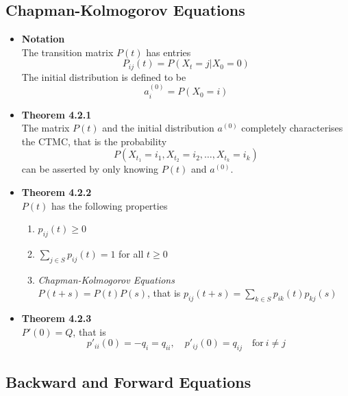 \documentclass[11pt,a4paper]{article}
\begin{document}
\subsection{Chapman-Kolmogorov Equations}

\begin{itemize}
    \item \textbf{Notation} \\
        The transition matrix $P(t)$ has entries
        \[
            P_{ij}(t) = P(X_t = j | X_0 = 0)
        \]
        The initial distribution is defined to be
        \[
            a_i^{(0)} = P(X_0 = i)
        \]

    \item \textbf{Theorem 4.2.1} \\
        The matrix $P(t)$ and the initial distribution $a^{(0)}$ completely characterises the CTMC,
        that is the probability
        \[
            P(X_{t_1} = i_1, X_{t_2} = i_2, \ldots, X_{t_k} = i_k)
        \]
        can be asserted by only knowing $P(t)$ and $a^{(0)}$.

    \item \textbf{Theorem 4.2.2} \\
        $P(t)$ has the following properties
        \begin{enumerate}
            \item $p_{ij}(t) \geq 0$
            \item $\sum_{j \in S} p_{ij}(t) = 1$ for all $t \geq 0$
            \item \emph{Chapman-Kolmogorov Equations} \\
                $P(t+s) = P(t) P(s)$, that is $p_{ij}(t+s) = \sum_{k \in S} p_{ik}(t) p_{kj}(s)$
        \end{enumerate}

    \item \textbf{Theorem 4.2.3} \\
        $P'(0) = Q$, that is
        \[
            p'_{ii}(0) = -q_i = q_{ii}, \quad p'_{ij}(0) = q_{ij} \quad \text{for} \ i \neq j
        \]

\end{itemize}

\subsection{Backward and Forward Equations}
\end{document}
